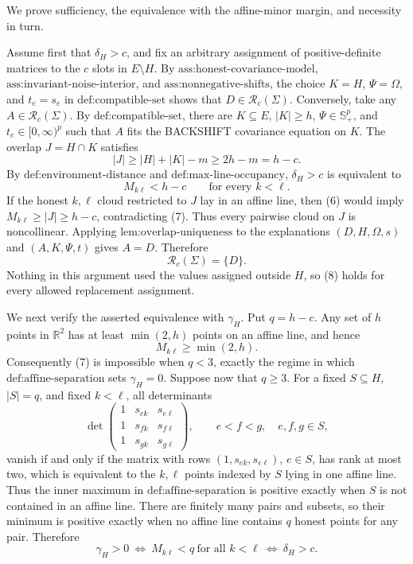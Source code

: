 We prove sufficiency, the equivalence with the affine-minor margin, and necessity in turn.

Assume first that \(\delta_H>c\), and fix an arbitrary assignment of positive-definite matrices to the \(c\) slots in \(E\setminus H\).  By \(\text{ass:honest-covariance-model}\), \(\text{ass:invariant-noise-interior}\), and \(\text{ass:nonnegative-shifts}\), the choice \(K=H\), \(\Psi=\Omega\), and \(t_e=s_e\) in \(\text{def:compatible-set}\) shows that \(D\in\mathcal R_c(\Sigma)\).  Conversely, take any \(A\in\mathcal R_c(\Sigma)\).  By \(\text{def:compatible-set}\), there are \(K\subseteq E\), \(|K|\ge h\), \(\Psi\in\mathbb S_+^p\), and \(t_e\in[0,\infty)^p\) such that \(A\) fits the BACKSHIFT covariance equation on \(K\).  The overlap \(J=H\cap K\) satisfies
\[
 |J|\ge |H|+|K|-m\ge2h-m=h-c. \tag{6}
\]
By \(\text{def:environment-distance}\) and \(\text{def:max-line-occupancy}\), \(\delta_H>c\) is equivalent to
\[
 M_{k\ell}<h-c\qquad\text{for every }k<\ell. \tag{7}
\]
If the honest \(k,\ell\) cloud restricted to \(J\) lay in an affine line, then (6) would imply \(M_{k\ell}\ge |J|\ge h-c\), contradicting (7).  Thus every pairwise cloud on \(J\) is noncollinear.  Applying \(\text{lem:overlap-uniqueness}\) to the explanations \((D,H,\Omega,s)\) and \((A,K,\Psi,t)\) gives \(A=D\).  Therefore
\[
 \mathcal R_c(\Sigma)=\{D\}. \tag{8}
\]
Nothing in this argument used the values assigned outside \(H\), so (8) holds for every allowed replacement assignment.

We next verify the asserted equivalence with \(\gamma_H\).  Put \(q=h-c\).  Any set of \(h\) points in \(\mathbb R^2\) has at least \(\min(2,h)\) points on an affine line, and hence
\[
 M_{k\ell}\ge\min(2,h). \tag{9}
\]
Consequently (7) is impossible when \(q<3\), exactly the regime in which \(\text{def:affine-separation}\) sets \(\gamma_H=0\).  Suppose now that \(q\ge3\).  For a fixed \(S\subseteq H\), \(|S|=q\), and fixed \(k<\ell\), all determinants
\[
 \det\begin{pmatrix}
 1&s_{ek}&s_{e\ell}\\
 1&s_{fk}&s_{f\ell}\\
 1&s_{gk}&s_{g\ell}
 \end{pmatrix},\qquad e<f<g,\quad e,f,g\in S, \tag{10}
\]
vanish if and only if the matrix with rows \((1,s_{ek},s_{e\ell})\), \(e\in S\), has rank at most two, which is equivalent to the \(k,\ell\) points indexed by \(S\) lying in one affine line.  Thus the inner maximum in \(\text{def:affine-separation}\) is positive exactly when \(S\) is not contained in an affine line.  There are finitely many pairs and subsets, so their minimum is positive exactly when no affine line contains \(q\) honest points for any pair.  Therefore
\[
 \gamma_H>0
 \ \Longleftrightarrow\ M_{k\ell}<q\ \text{for all }k<\ell
 \ \Longleftrightarrow\ \delta_H>c. \tag{11}
\]

